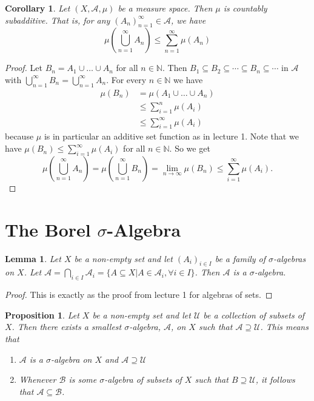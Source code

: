 \documentclass[letterpaper, 12pt]{article}
\newcommand{\cU}{\mathcal{U}}
\newcommand{\cB}{\mathcal{B}}
\newcommand{\bN}{\mathbb{N}}
\newcommand{\sA}{\mathcal{A}}
\theoremstyle{stdthm}
\newtheorem{lem}[thm]{Lemma}
\newtheorem{cor}[thm]{Corollary}
\newtheorem{prop}[thm]{Proposition}
\theoremstyle{stddef}
\theoremstyle{stdnonum}
\theoremstyle{stdqands}
\theoremstyle{stdbold}
\begin{document}
\begin{cor}
Let $(X,\sA,\mu)$ be a measure space. Then $\mu$ is  countably subadditive. That is, for any $(A_n)_{n=1}^\infty \in \sA$, we have
\[\mu \left( \bigcup_{n=1}^\infty A_n \right) \leq \sum_{n=1}^\infty \mu(A_n) \]
\end{cor}

\begin{proof}
Let $B_n = A_1 \cup \dots \cup A_n$ for all $n \in \bN$. Then $B_1 \subseteq B_2 \subseteq \cdots \subseteq B_n \subseteq \cdots$ in $\sA$ with $\bigcup_{n=1}^\infty B_n = \bigcup_{n=1}^\infty A_n$.  For every $n \in \bN$ we have 
\begin{align*}
\mu(B_n) &= \mu(A_1\cup \dots \cup A_n)\\
&\leq \sum_{i=1}^n \mu(A_i) \\
&\leq \sum_{i=1}^\infty \mu(A_i)
\end{align*}
because $\mu$ is in particular an additive set function as in lecture 1. Note that we have $\mu(B_n) \leq \sum_{i=1}^\infty \mu(A_i)$ for all $n\in \bN$. So we get 
\[
\mu\left(\bigcup_{n=1}^\infty A_n \right) = \mu \left( \bigcup_{n=1}^\infty B_n \right) = \lim_{n\rightarrow \infty} \mu(B_n) \leq \sum_{i=1}^\infty \mu(A_i).
\]
\end{proof}

\newpage

\section{The Borel $\sigma$-Algebra}

\begin{lem}
Let $X$ be a non-empty set and let $(A_i)_{i\in I}$ be a family of $\sigma$-algebras on $X$. Let $\sA = \bigcap_{i\in I}\sA_i = \{ A \subseteq X| A \in \sA_i, \forall i \in I\}$. Then $\sA$ is a $\sigma$-algebra. 
\end{lem}

\begin{proof}
This is exactly as the proof from lecture 1 for algebras of sets. 
\end{proof}

\begin{prop}
Let $X$ be a non-empty set and let $\cU$ be a collection of subsets of $X$. Then there exists a smallest $\sigma$-algebra, $\sA$, on $X$ such that $\sA \supseteq \cU$. This means that 
\begin{enumerate}
\item $\sA$ is a $\sigma$-algebra on $X$ and $\sA \supseteq \cU$
\item Whenever $\cB$ is some $\sigma$-algebra of subsets of $X$ such that $B \supseteq \cU$, it follows that $\sA \subseteq \cB$. 
\end{enumerate}
\end{prop}
\end{document}
